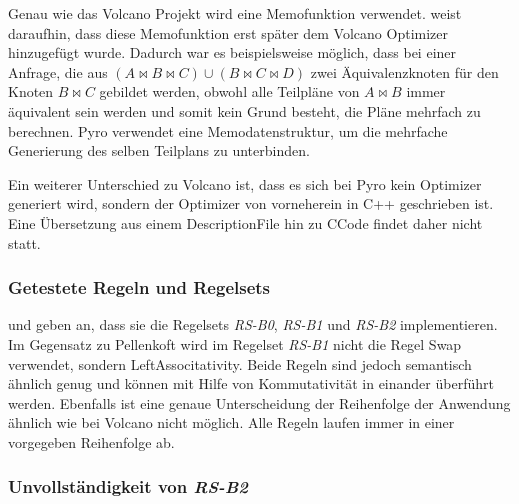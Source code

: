 Genau wie das Volcano Projekt wird eine Memofunktion verwendet. \cite{roy2001multi} weist daraufhin, dass diese Memofunktion erst später dem Volcano Optimizer hinzugefügt wurde. Dadurch war es beispielsweise möglich, dass bei einer Anfrage, die aus $(A \Join B \Join C) \cup (B \Join C \Join D)$ zwei Äquivalenzknoten für den Knoten $B \Join C$ gebildet werden, obwohl alle Teilpläne von $A \Join B$ immer äquivalent sein werden und somit kein Grund besteht, die Pläne mehrfach zu berechnen. Pyro verwendet eine Memodatenstruktur, um die mehrfache Generierung des selben Teilplans zu unterbinden.

Ein weiterer Unterschied zu Volcano ist, dass es sich bei Pyro kein Optimizer generiert wird, sondern der Optimizer von vorneherein in C++ geschrieben ist. Eine Übersetzung aus einem Description\-File hin zu C\-Code findet daher nicht statt.

\subsubsection{Getestete Regeln und Regelsets}

\cite{shanbhag2014optimizing} und \cite{roy2001multi} geben an, dass sie die Regelsets \textit{RS-B0}, \textit{RS-B1} und \textit{RS-B2} implementieren. Im Gegensatz zu Pellenkoft wird im Regelset \textit{RS-B1} nicht die Regel Swap verwendet, sondern Left\-Associtativity. Beide Regeln sind jedoch semantisch ähnlich genug und können mit Hilfe von Kommutativität in einander überführt werden. Ebenfalls ist eine genaue Unterscheidung der Reihenfolge der Anwendung ähnlich wie bei Volcano nicht möglich. Alle Regeln laufen immer in einer vorgegeben Reihenfolge ab.






\subsubsection{Unvollständigkeit von \textit{RS-B2}}




